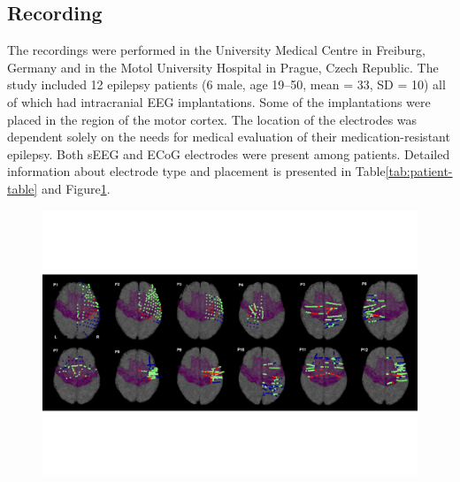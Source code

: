 \subsection{Recording}\label{subsec:recording}
The recordings were performed in the University Medical Centre in Freiburg, Germany and in the Motol University Hospital in Prague, Czech Republic.
The study included 12 epilepsy patients (6 male, age 19--50, mean = 33, SD = 10) all of which had intracranial EEG implantations.
Some of the implantations were placed in the region of the motor cortex.
The location of the electrodes was dependent solely on the needs for medical evaluation of their medication-resistant epilepsy.
Both sEEG and ECoG electrodes were present among patients.
Detailed information about electrode type and placement is presented in Table\ref{tab:patient-table} and Figure\ref{fig:electrodes}.

\begin{figure}[!htbp]
\centering
\includegraphics[width=0.8\linewidth]{img/ch3/electrodes}
\caption{}
\label{fig:electrodes}
\end{figure}

